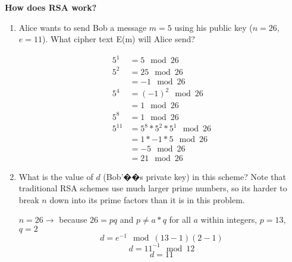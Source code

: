 \question \textbf{How does RSA work?}
\begin{enumerate}[label=\alph*.]
\item Alice wants to send Bob a message $m = 5$ using his public
key ($n = 26$, $e = 11$). What cipher text E(m) will Alice send?

\begin{solution}[1 in]
\begin{align*}
5^1 &= 5 \mod 26 \\
5^2 &= 25 \mod 26 \\
&= -1 \mod 26\\
5^4 &= (-1)^2 \mod 26 \\
&= 1 \mod 26\\
5^8 &= 1 \mod 26 \\
5^{11} &= 5^8  * 5^2 * 5^1 \mod 26 \\
&= 1 * -1 * 5 \mod 26 \\
&= -5 \mod 26\\
&= 21 \mod 26
\end{align*}
\end{solution}

\item What is the value of $d$ (Bob'��s private key) in this scheme?
Note that traditional RSA schemes use much larger prime numbers,
so its harder to break $n$ down into its prime factors than it is in
this problem.

\begin{solution}[1 in]
$n=26  \rightarrow$ because $26 = pq$ and $p\neq a*q$ for all $a$
within integers, $p=13$, $q=2$
\[d = e^{-1} \mod (13-1)(2-1)\]
\[d = 11^{-1} \mod 12\]
\[d = 11\]
\end{solution}
\end{enumerate}

